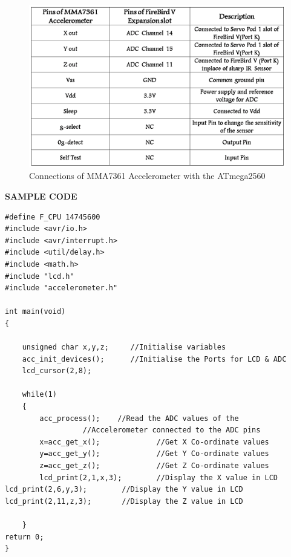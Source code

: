 \documentclass[a4paper,12 pt]{article}
\begin{document}
\begin{figure}[!h]
\begin{center}
\includegraphics[scale=0.65]{Picture1.png}
\caption{Connections of MMA7361 Accelerometer with the ATmega2560}

\end{center}
\end{figure}
\newpage
\begin{center}
\LARGE{\textbf{SAMPLE CODE}}
\end{center}
\large 
\begin{verbatim}
#define F_CPU 14745600
#include <avr/io.h>
#include <avr/interrupt.h>
#include <util/delay.h>
#include <math.h>
#include "lcd.h"
#include "accelerometer.h"

int main(void)
{
	
	unsigned char x,y,z;     //Initialise variables
	acc_init_devices();      //Initialise the Ports for LCD & ADC
	lcd_cursor(2,8);
	
	while(1)
	{
		acc_process();    //Read the ADC values of the
                  //Accelerometer connected to the ADC pins
		x=acc_get_x();             //Get X Co-ordinate values
		y=acc_get_y();             //Get Y Co-ordinate values
		z=acc_get_z();             //Get Z Co-ordinate values
		lcd_print(2,1,x,3);        //Display the X value in LCD  
lcd_print(2,6,y,3);        //Display the Y value in LCD
lcd_print(2,11,z,3);       //Display the Z value in LCD
 
	}		
return 0;
}

\end{verbatim}
\newpage
\end{document}
